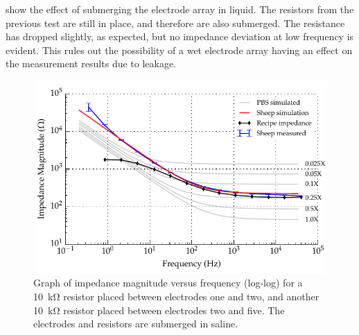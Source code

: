  show the effect of submerging the electrode array in liquid. The resistors from the previous test are still in place, and therefore are also submerged.
The resistance has dropped slightly, as expected, but no impedance deviation at low frequency is evident.
This rules out the possibility of a wet electrode array having an effect on the measurement results due to leakage.

\begin{figure}
    \centering
    \includegraphics[width=\textwidth]{content/appendices/Solution-Impedance-Measurements/graphics/run14_calibration_10k_water_salt_amended_ZVsF_graph_mag}
    \caption{\label{fig:calibration_10kRes_saline_mag}Graph of impedance magnitude versus frequency (log-log) for a \SI{10}{\kilo\ohm} resistor placed between electrodes one and two, and another \SI{10}{\kilo\ohm} resistor placed between electrodes two and five. The electrodes and resistors are submerged in saline.}
\end{figure}


